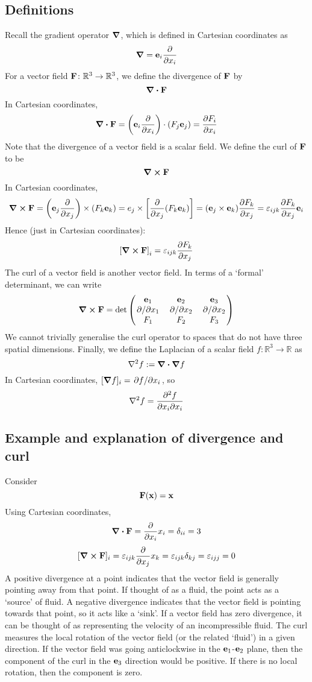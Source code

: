 \subsection{Definitions}
Recall the gradient operator \(\grad\), which is defined in Cartesian coordinates as
\[
	\grad = \vb e_i \frac{\partial}{\partial x_i}
\]
For a vector field \(\vb F \colon \mathbb R^3 \to \mathbb R^3\), we define the divergence of \(\vb F\) by
\[
	\div{\vb F}
\]
In Cartesian coordinates,
\[
	\div{\vb F} = \left( \vb e_i \frac{\partial}{\partial x_i} \right) \cdot (F_j \vb e_j) = \pdv{F_i}{x_i}
\]
Note that the divergence of a vector field is a scalar field.
We define the curl of \(\vb{F}\) to be
\[
	\curl{\vb F}
\]
In Cartesian coordinates,
\[
	\curl{\vb F} = \left( \vb e_j \pdv{x_j} \right) \times (F_k \vb e_k) = e_j \times \left[ \pdv{x_j}(F_k \vb e_k) \right] = (\vb e_j \times \vb e_k) \pdv{F_k}{x_j} = \varepsilon_{ijk} \pdv{F_k}{x_j}\vb e_i
\]
Hence (just in Cartesian coordinates):
\[
	\left[ \curl{\vb F} \right]_i = \varepsilon_{ijk} \pdv{F_k}{x_j}
\]
The curl of a vector field is another vector field.
In terms of a `formal' determinant, we can write
\[
	\curl{\vb F} = \det \begin{pmatrix}
		\vb e_1    & \vb e_2    & \vb e_3    \\
		\pdv*{x_1} & \pdv*{x_2} & \pdv*{x_2} \\
		F_1        & F_2        & F_3
	\end{pmatrix}
\]
We cannot trivially generalise the curl operator to spaces that do not have three spatial dimensions.
Finally, we define the Laplacian of a scalar field \(f \colon \mathbb R^3 \to \mathbb R\) as
\[
	\laplacian{f} := \div{\grad{f}}
\]
In Cartesian coordinates, \([\grad{f}]_i = \pdv*{f}{x_i}\), so
\[
	\laplacian{f} = \pdv{f}{x_i}{x_i}
\]

\subsection{Example and explanation of divergence and curl}
Consider
\[
	\vb F(\vb x) = \vb x
\]
Using Cartesian coordinates,
\[
	\div{\vb F} = \pdv{x_i}x_i = \delta_{ii} = 3
\]
\[
	[\curl{\vb F}]_i = \varepsilon_{ijk} \pdv{x_j} x_k = \varepsilon_{ijk} \delta_{kj} = \varepsilon_{ijj} = 0
\]
A positive divergence at a point indicates that the vector field is generally pointing away from that point.
If thought of as a fluid, the point acts as a `source' of fluid.
A negative divergence indicates that the vector field is pointing towards that point, so it acts like a `sink'.
If a vector field has zero divergence, it can be thought of as representing the velocity of an incompressible fluid.
The curl measures the local rotation of the vector field (or the related `fluid') in a given direction.
If the vector field was going anticlockwise in the \(\vb e_1\)-\(\vb e_2\) plane, then the component of the curl in the \(\vb e_3\) direction would be positive.
If there is no local rotation, then the component is zero.

